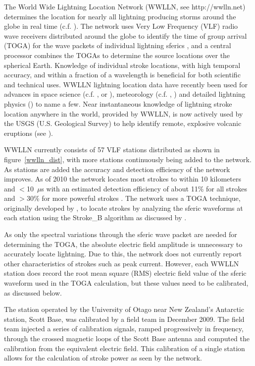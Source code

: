 \documentclass[12pt]{article}
\begin{document}
The World Wide Lightning Location Network (WWLLN, see http://wwlln.net) determines the location for nearly all lightning producing storms around the globe in real time (c.f. \citet{Jacobson2006c}). The network uses Very Low Frequency (VLF) radio wave receivers distributed around the globe to identify the time of group arrival (TOGA) for the wave packets of individual lightning sferics \citep{Dowden2002d}, and a central processor combines the TOGAs to determine the source locations over the spherical Earth. Knowledge of individual stroke locations, with high temporal accuracy, and within a fraction of a wavelength is beneficial for both scientific and technical uses. WWLLN lightning location data have recently been used for advances in space science (c.f. \citet{Kumar2009}, or \citet{Holzworth2011}), meteorology (c.f. \citet{Price2009}, \citet{Thomas2010d}) and detailed lightning physics (\citet{Connaughton2010a}) to name a few. Near instantaneous knowledge of lightning stroke location anywhere in the world, provided by WWLLN, is now actively used by the USGS (U.S. Geological Survey) to help identify remote, explosive volcanic eruptions (see \citet{Doughton2010}).

WWLLN currently consists of 57 VLF stations distributed as shown in figure~\ref{wwlln_dist}, with more stations continuously being added to the network. As stations are added the accuracy and detection efficiency of the network improves. As of 2010 the network locates most strokes to within 10 kilometers and $<$10~$\mu$s with an estimated detection efficiency of about 11\% for all strokes and $>$30\% for more powerful strokes \citep{Abarca2010,Rodger2009}. The network uses a TOGA technique, originally developed by \citet{Dowden2000}, to locate strokes by analyzing the sferic waveforms at each station using the Stroke\_B algorithm as discussed by \citet{Rodger2006,Rodger2009}.

As only the spectral variations through the sferic wave packet are needed for determining the TOGA, the absolute electric field amplitude is unnecessary to accurately locate lightning. Due to this, the network does not currently report other characteristics of strokes such as peak current. However, each WWLLN station does record the root mean square (RMS) electric field value of the sferic waveform used in the TOGA calculation, but these values need to be calibrated, as discussed below.

The station operated by the University of Otago near New Zealand's Antarctic station, Scott Base, was calibrated by a field team in December 2009. The field team injected a series of calibration signals, ramped progressively in frequency, through the crossed magnetic loops of the Scott Base antenna and computed the calibration from the equivalent electric field. This calibration of a single station allows for the calculation of stroke power as seen by the network.
\end{document}
